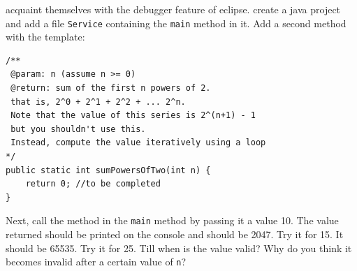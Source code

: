 \begin{questions}
\question acquaint themselves with the debugger feature of eclipse. create a java project and add a file \texttt{Service} containing the \texttt{main} method in it. Add a second method with the template:

\begin{lstlisting}
/**
 @param: n (assume n >= 0)
 @return: sum of the first n powers of 2.
 that is, 2^0 + 2^1 + 2^2 + ... 2^n.
 Note that the value of this series is 2^(n+1) - 1 
 but you shouldn't use this. 
 Instead, compute the value iteratively using a loop
*/
public static int sumPowersOfTwo(int n) {
	return 0; //to be completed
}
\end{lstlisting}

Next, call the method in the \texttt{main} method by passing it a value 10. The value returned should be printed on the console and should be 2047. Try it for 15. It should be 65535. Try it for 25. Till when is the value valid? Why do you think it becomes invalid after a certain value of \texttt{n}?
\end{questions}

